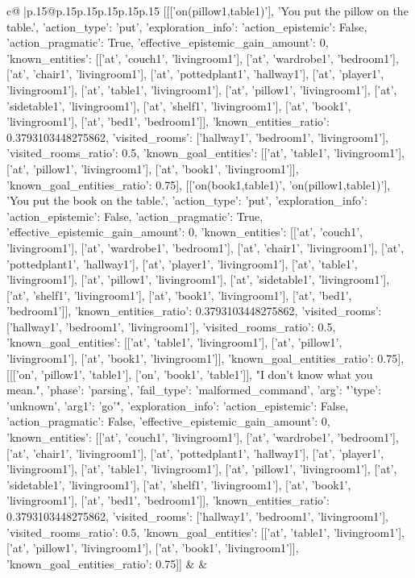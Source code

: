 \documentclass{article}
\begin{document}
{\begin{supertabular}{c@{$\;$}|p{.15\linewidth}@{}p{.15\linewidth}p{.15\linewidth}p{.15\linewidth}p{.15\linewidth}p{.15\linewidth}}
{{{	 [[['on(pillow1,table1)'], 'You put the pillow on the table.', {'action_type': 'put', 'exploration_info': {'action_epistemic': False, 'action_pragmatic': True, 'effective_epistemic_gain_amount': 0, 'known_entities': [['at', 'couch1', 'livingroom1'], ['at', 'wardrobe1', 'bedroom1'], ['at', 'chair1', 'livingroom1'], ['at', 'pottedplant1', 'hallway1'], ['at', 'player1', 'livingroom1'], ['at', 'table1', 'livingroom1'], ['at', 'pillow1', 'livingroom1'], ['at', 'sidetable1', 'livingroom1'], ['at', 'shelf1', 'livingroom1'], ['at', 'book1', 'livingroom1'], ['at', 'bed1', 'bedroom1']], 'known_entities_ratio': 0.3793103448275862, 'visited_rooms': ['hallway1', 'bedroom1', 'livingroom1'], 'visited_rooms_ratio': 0.5, 'known_goal_entities': [['at', 'table1', 'livingroom1'], ['at', 'pillow1', 'livingroom1'], ['at', 'book1', 'livingroom1']], 'known_goal_entities_ratio': 0.75}}], [['on(book1,table1)', 'on(pillow1,table1)'], 'You put the book on the table.', {'action_type': 'put', 'exploration_info': {'action_epistemic': False, 'action_pragmatic': True, 'effective_epistemic_gain_amount': 0, 'known_entities': [['at', 'couch1', 'livingroom1'], ['at', 'wardrobe1', 'bedroom1'], ['at', 'chair1', 'livingroom1'], ['at', 'pottedplant1', 'hallway1'], ['at', 'player1', 'livingroom1'], ['at', 'table1', 'livingroom1'], ['at', 'pillow1', 'livingroom1'], ['at', 'sidetable1', 'livingroom1'], ['at', 'shelf1', 'livingroom1'], ['at', 'book1', 'livingroom1'], ['at', 'bed1', 'bedroom1']], 'known_entities_ratio': 0.3793103448275862, 'visited_rooms': ['hallway1', 'bedroom1', 'livingroom1'], 'visited_rooms_ratio': 0.5, 'known_goal_entities': [['at', 'table1', 'livingroom1'], ['at', 'pillow1', 'livingroom1'], ['at', 'book1', 'livingroom1']], 'known_goal_entities_ratio': 0.75}}], [[['on', 'pillow1', 'table1'], ['on', 'book1', 'table1']], "I don't know what you mean.", {'phase': 'parsing', 'fail_type': 'malformed_command', 'arg': "{'type': 'unknown', 'arg1': 'go'}", 'exploration_info': {'action_epistemic': False, 'action_pragmatic': False, 'effective_epistemic_gain_amount': 0, 'known_entities': [['at', 'couch1', 'livingroom1'], ['at', 'wardrobe1', 'bedroom1'], ['at', 'chair1', 'livingroom1'], ['at', 'pottedplant1', 'hallway1'], ['at', 'player1', 'livingroom1'], ['at', 'table1', 'livingroom1'], ['at', 'pillow1', 'livingroom1'], ['at', 'sidetable1', 'livingroom1'], ['at', 'shelf1', 'livingroom1'], ['at', 'book1', 'livingroom1'], ['at', 'bed1', 'bedroom1']], 'known_entities_ratio': 0.3793103448275862, 'visited_rooms': ['hallway1', 'bedroom1', 'livingroom1'], 'visited_rooms_ratio': 0.5, 'known_goal_entities': [['at', 'table1', 'livingroom1'], ['at', 'pillow1', 'livingroom1'], ['at', 'book1', 'livingroom1']], 'known_goal_entities_ratio': 0.75}}]] 
	  } 
	   } 
	   } 
	 & & \\ 
 


\end{supertabular}}
\end{document}
